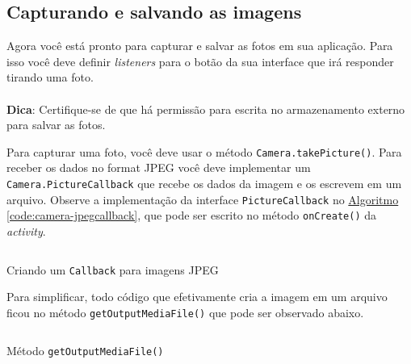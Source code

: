 \documentclass[a4paper,12pt,brazil,oneside]{book}
\begin{document}
	\newpage

	\subsection{Capturando e salvando as imagens}
		Agora você está pronto para capturar e salvar as fotos em sua aplicação. Para isso você deve definir \emph{listeners} para o botão da sua interface que irá responder tirando uma foto.

\begin{framed}
\paragraph{}\textbf{Dica}: Certifique-se de que há permissão para escrita no armazenamento externo para salvar as fotos.
\textit{}
\end{framed}

		Para capturar uma foto, você deve usar o método \texttt{Camera.takePicture()}. Para receber os dados no format JPEG você deve implementar um \texttt{Camera.PictureCallback} que recebe os dados da imagem e os escrevem em um arquivo. Observe a implementação da interface \texttt{PictureCallback} no \hyperref[code:camera-jpegcallback]{Algoritmo \ref*{code:camera-jpegcallback}}, que pode ser escrito no método \texttt{onCreate()} da \emph{activity}.

		\begin{listing}[H]
		\inputminted[linenos=true,fontsize=\small,frame=lines, framesep=2mm, tabsize=2,numbersep=5pt]{java}{src/api/camera/jpegcallback.java}
		\caption{Criando um \texttt{Callback} para imagens JPEG}
		\label{code:camera-jpegcallback}
		\end{listing} 			

		Para simplificar, todo código que efetivamente cria a imagem em um arquivo ficou no método \texttt{getOutputMediaFile()} que pode ser observado abaixo.

		\begin{listing}[H]
		\inputminted[linenos=true,fontsize=\small,frame=lines, framesep=2mm, tabsize=2,numbersep=5pt]{java}{src/api/camera/getoutputmediafile.java}
		\caption{Método \texttt{getOutputMediaFile()}}
		\label{code:camera-getoutput}
		\end{listing} 			
\end{document}
